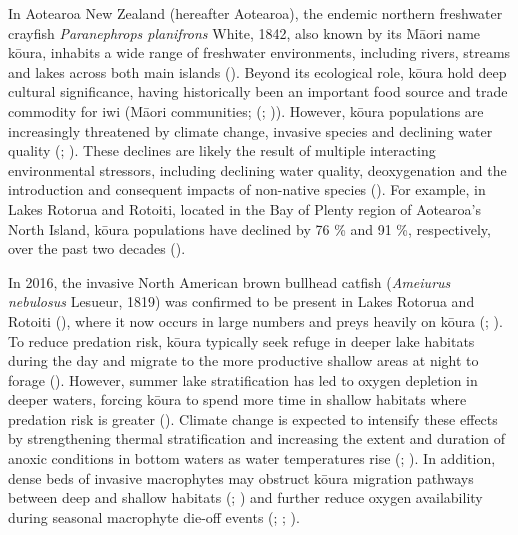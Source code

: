 \documentclass[
  letterpaper,
  DIV=11,
  numbers=noendperiod]{scrartcl}
\begin{document}
In Aotearoa New Zealand (hereafter Aotearoa), the endemic northern
freshwater crayfish \emph{Paranephrops planifrons} White, 1842, also
known by its Māori name kōura, inhabits a wide range of freshwater
environments, including rivers, streams and lakes across both main
islands (). Beyond its
ecological role, kōura hold deep cultural significance, having
historically been an important food source and trade commodity for iwi
(Māori communities; (;
)). However, kōura
populations are increasingly threatened by climate change, invasive
species and declining water quality (; ). These
declines are likely the result of multiple interacting environmental
stressors, including declining water quality, deoxygenation and the
introduction and consequent impacts of non-native species
(). For example, in
Lakes Rotorua and Rotoiti, located in the Bay of Plenty region of
Aotearoa's North Island, kōura populations have declined by 76 \% and 91
\%, respectively, over the past two decades
().

In 2016, the invasive North American brown bullhead catfish
(\emph{Ameiurus nebulosus} Lesueur, 1819) was confirmed to be present in
Lakes Rotorua and Rotoiti (),
where it now occurs in large numbers and preys heavily on kōura
(;
). To reduce predation
risk, kōura typically seek refuge in deeper lake habitats during the day
and migrate to the more productive shallow areas at night to forage
(). However, summer lake
stratification has led to oxygen depletion in deeper waters, forcing
kōura to spend more time in shallow habitats where predation risk is
greater (). Climate change is
expected to intensify these effects by strengthening thermal
stratification and increasing the extent and duration of anoxic
conditions in bottom waters as water temperatures rise
(;
). In addition, dense beds
of invasive macrophytes may obstruct kōura migration pathways between
deep and shallow habitats (; ) and further
reduce oxygen availability during seasonal macrophyte die-off events
(;
;
).
\end{document}
